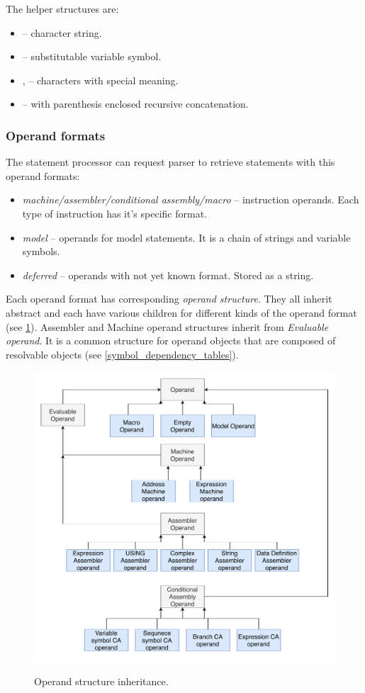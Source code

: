 The helper structures are:
\begin{itemize}
	\item {} -- character string.
	\item {} -- substitutable variable symbol.
	\item {},  -- characters with special meaning.
	\item {} -- with parenthesis enclosed recursive concatenation.
\end{itemize}

\subsubsection{Operand formats}
The statement processor can request parser to retrieve statements with this operand formats:
\begin{itemize}
	\item \emph{machine/assembler/conditional assembly/macro} -- instruction operands. Each type of instruction has it's specific format.
	\item \emph{model} -- operands for model statements. It is a chain of strings and variable symbols.
	\item \emph{deferred} -- operands with not yet known format. Stored as a string.
\end{itemize}

Each operand format has corresponding \emph{operand structure}. They all inherit abstract  and each have various children for different kinds of the operand format (see \cref{fig06:operand_arch}). Assembler and Machine operand structures inherit from \emph{Evaluable operand}. It is a common structure for operand objects that are composed of resolvable objects (see \cref{symbol_dependency_tables}).

\begin{figure}[H]
	\centering
	\includegraphics[width=\textwidth]{img/operand_arch}
	\label{fig06:operand_arch}
	\caption{Operand structure inheritance.}
\end{figure}

